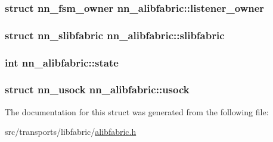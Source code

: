 \subsubsection[{listener\+\_\+owner}]{\setlength{\rightskip}{0pt plus 5cm}struct {\bf nn\+\_\+fsm\+\_\+owner} nn\+\_\+alibfabric\+::listener\+\_\+owner}\hypertarget{structnn__alibfabric_a78da852e79fbc018efabdb7215671dfc}{}\label{structnn__alibfabric_a78da852e79fbc018efabdb7215671dfc}
\subsubsection[{slibfabric}]{\setlength{\rightskip}{0pt plus 5cm}struct {\bf nn\+\_\+slibfabric} nn\+\_\+alibfabric\+::slibfabric}\hypertarget{structnn__alibfabric_aeb290b975bf6b052ec19e015ff95e6a1}{}\label{structnn__alibfabric_aeb290b975bf6b052ec19e015ff95e6a1}
\subsubsection[{state}]{\setlength{\rightskip}{0pt plus 5cm}int nn\+\_\+alibfabric\+::state}\hypertarget{structnn__alibfabric_a21e93d82aff04c8a9ae6ba0122396ab4}{}\label{structnn__alibfabric_a21e93d82aff04c8a9ae6ba0122396ab4}
\subsubsection[{usock}]{\setlength{\rightskip}{0pt plus 5cm}struct {\bf nn\+\_\+usock} nn\+\_\+alibfabric\+::usock}\hypertarget{structnn__alibfabric_ac33d4e6efd8a6f9246e1573b05b7cad3}{}\label{structnn__alibfabric_ac33d4e6efd8a6f9246e1573b05b7cad3}


The documentation for this struct was generated from the following file\+:\begin{DoxyCompactItemize}
\item 
src/transports/libfabric/\hyperlink{alibfabric_8h}{alibfabric.\+h}\end{DoxyCompactItemize}

